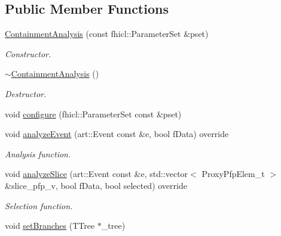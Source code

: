 \subsection*{Public Member Functions}
\begin{DoxyCompactItemize}
\item 
\hyperlink{classanalysis_1_1ContainmentAnalysis_a1544702632da81fbf99462a4099ad15e}{Containment\+Analysis} (const fhicl\+::\+Parameter\+Set \&pset)
\begin{DoxyCompactList}\small\item\em Constructor. \end{DoxyCompactList}\item 
\hyperlink{classanalysis_1_1ContainmentAnalysis_ae5f996c6ad46bc60af73f632eb3b44ae}{$\sim$\+Containment\+Analysis} ()\hypertarget{classanalysis_1_1ContainmentAnalysis_ae5f996c6ad46bc60af73f632eb3b44ae}{}\label{classanalysis_1_1ContainmentAnalysis_ae5f996c6ad46bc60af73f632eb3b44ae}

\begin{DoxyCompactList}\small\item\em Destructor. \end{DoxyCompactList}\item 
void \hyperlink{classanalysis_1_1ContainmentAnalysis_a0ea0287e139776b12c996ca624e8e8eb}{configure} (fhicl\+::\+Parameter\+Set const \&pset)
\item 
void \hyperlink{classanalysis_1_1ContainmentAnalysis_a5bcf033310f0e8f58fd6f4f46f216985}{analyze\+Event} (art\+::\+Event const \&e, bool f\+Data) override\hypertarget{classanalysis_1_1ContainmentAnalysis_a5bcf033310f0e8f58fd6f4f46f216985}{}\label{classanalysis_1_1ContainmentAnalysis_a5bcf033310f0e8f58fd6f4f46f216985}

\begin{DoxyCompactList}\small\item\em Analysis function. \end{DoxyCompactList}\item 
void \hyperlink{classanalysis_1_1ContainmentAnalysis_a6e3c839d18ff3001b46be5fde80a5d04}{analyze\+Slice} (art\+::\+Event const \&e, std\+::vector$<$ Proxy\+Pfp\+Elem\+\_\+t $>$ \&slice\+\_\+pfp\+\_\+v, bool f\+Data, bool selected) override
\begin{DoxyCompactList}\small\item\em Selection function. \end{DoxyCompactList}\item 
void \hyperlink{classanalysis_1_1ContainmentAnalysis_a4f8ad99a58baf6623cbeb4aa686939d0}{set\+Branches} (T\+Tree $\ast$\+\_\+tree)\hypertarget{classanalysis_1_1ContainmentAnalysis_a4f8ad99a58baf6623cbeb4aa686939d0}{}\label{classanalysis_1_1ContainmentAnalysis_a4f8ad99a58baf6623cbeb4aa686939d0}


\end{DoxyCompactItemize}
